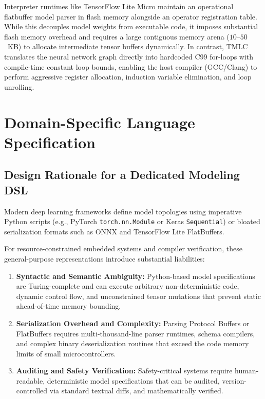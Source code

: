 \documentclass[11pt,a4paper]{article}
\begin{document}
Interpreter runtimes like TensorFlow Lite Micro maintain an operational flatbuffer model parser in flash memory alongside an operator registration table. While this decouples model weights from executable code, it imposes substantial flash memory overhead and requires a large contiguous memory arena ($10$--$50$~KB) to allocate intermediate tensor buffers dynamically. In contrast, TMLC translates the neural network graph directly into hardcoded C99 for-loops with compile-time constant loop bounds, enabling the host compiler (GCC/Clang) to perform aggressive register allocation, induction variable elimination, and loop unrolling.

\section{Domain-Specific Language Specification}
\label{sec:dsl_spec}

\subsection{Design Rationale for a Dedicated Modeling DSL}
Modern deep learning frameworks define model topologies using imperative Python scripts (e.g., PyTorch \texttt{torch.nn.Module} or Keras \texttt{Sequential}) or bloated serialization formats such as ONNX and TensorFlow Lite FlatBuffers. 

For resource-constrained embedded systems and compiler verification, these general-purpose representations introduce substantial liabilities:
\begin{enumerate}[leftmargin=*]
    \item \textbf{Syntactic and Semantic Ambiguity:} Python-based model specifications are Turing-complete and can execute arbitrary non-deterministic code, dynamic control flow, and unconstrained tensor mutations that prevent static ahead-of-time memory bounding.
    \item \textbf{Serialization Overhead and Complexity:} Parsing Protocol Buffers or FlatBuffers requires multi-thousand-line parser runtimes, schema compilers, and complex binary deserialization routines that exceed the code memory limits of small microcontrollers.
    \item \textbf{Auditing and Safety Verification:} Safety-critical systems require human-readable, deterministic model specifications that can be audited, version-controlled via standard textual diffs, and mathematically verified.
\end{enumerate}
\end{document}

